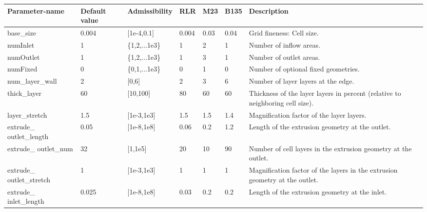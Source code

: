 \documentclass[oneside]{article}
\numberwithin{equation}{section}
\numberwithin{figure}{section}
\numberwithin{figure}{section}
\begin{document}
\begin{table}[h]
    \centering
    \begin{tabular}{|p{2.1cm}|p{1cm}|p{1.5cm}|p{0.6cm}|p{0.5cm}|p{0.5cm}|p{5.6cm}|} %
        \hline
        \cellcolor{light-gray} Parameter-name & \cellcolor{light-gray} Default value 
        & \cellcolor{light-gray} Admissibility & \cellcolor{light-gray} RLR & \cellcolor{light-gray} M23 & \cellcolor{light-gray} B135
        & \cellcolor{light-gray} Description \\
        \hline
        base\_size         & 0.004  & [1e-4,0.1]          & 0.004 & 0.03 &  0.04  & Grid fineness: Cell size.\\
        \hline
        numInlet           & 1      & \{1,2,...1e3\}      & 1     &   2  &   1    & Number of inflow areas.\\
        \hline
        numOutlet          & 1      & \{1,2,...1e3\}      & 1     &   3  &   1    & Number of outlet areas.\\
        \hline
        numFixed           & 0      & \{0,1,...1e3\}     & 0     &   1    &   0    & Number of optional fixed geometries.\\
        \hline
        num\_layer\_wall   &   2    & [0,6]              & 2     &   3    &   6    & Number of layer layers at the edge.\\
        \hline
        thick\_layer       &   60   & [10,100]           & 80    &   60   & 60     & Thickness of the layer layers in percent (relative to neighboring cell size).\\
        \hline 
        layer\_stretch     &   1.5  & [1e-3,1e3]         & 1.5   & 1.5    & 1.4    & Magnification factor of the layer layers.\\ 
        \hline
        extrude\_ \qquad \; outlet\_length & 0.05 &  [1e-8,1e8] & 0.06 & 0.2 & 1.2 & Length of the extrusion geometry at the outlet.\\
        \hline
        extrude\_ \qquad \; outlet\_num    & 32   &  [1,1e5]    & 20 & 10   & 90   & Number of cell layers in the extrusion geometry at the outlet.\\
        \hline
        extrude\_ \qquad \; outlet\_stretch & 1   &   [1e-3,1e3]  & 1 & 1   &  1   & Magnification factor of the layers in the extrusion geometry at the outlet.\\
        \hline
        extrude\_ \qquad \; inlet\_length   & 0.025 &   [1e-8,1e8]    & 0.03 & 0.2  & 0.2 & Length of the extrusion geometry at the inlet.\\
        \hline

\end{tabular}
\end{table}
\end{document}
